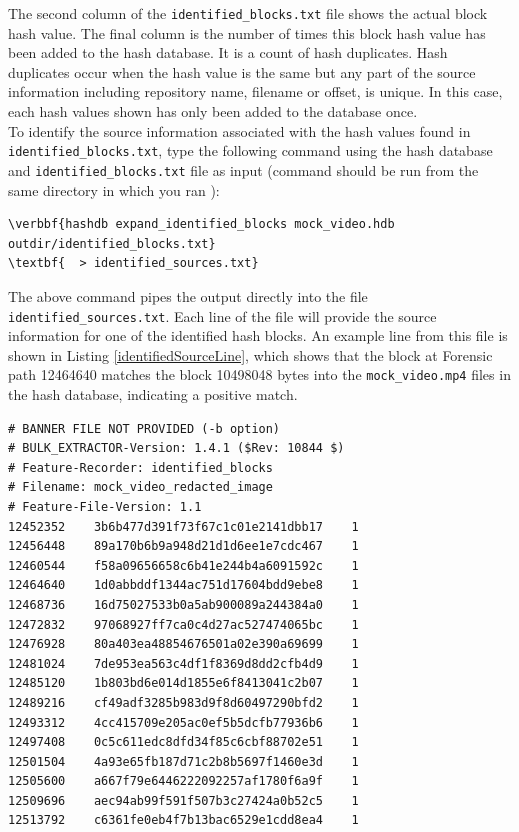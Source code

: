 \documentclass[11pt,fleqn]{article} %
\begin{document}
The second column of the \texttt{identified\_blocks.txt} file shows the actual block hash value. The final column is the number of times this block hash value has been added to the hash database. It is a count of hash duplicates. Hash duplicates occur when the hash value is the same but any part of the source information including repository name, filename or offset, is unique. In this case, each hash values shown has only been added to the database once.\\

To identify the source information associated with the hash values found in \texttt{identified\_blocks.txt}, type the following command using the hash database and \texttt{identified\_blocks.txt} file as input (command should be run from the same directory in which you ran \bulk):
\begin{Verbatim}[commandchars=\\\{\}]
\verbbf{hashdb expand_identified_blocks mock_video.hdb outdir/identified_blocks.txt} 
\textbf{  > identified_sources.txt}
\end{Verbatim}
The above command pipes the output directly into the file \texttt{identified\_sources.txt}. Each line of the file will provide the source information for one of the identified hash blocks. An example line from this file is shown in Listing \ref{identifiedSourceLine},
which shows that the block at Forensic path 12464640 matches the block 10498048 bytes into the \texttt{mock\_video.mp4} files in the hash database, indicating a positive match.\\

\lstset{style=customfile}
\begin{lstlisting}[float, caption={The \texttt{identified\_blocks.txt} file produced by \bulk's \textit{hashdb} scanner. First column is the forensic path, second is the hash value, and third is the number of times the hash value occurs in the database}, label=identifiedBlocks]
# BANNER FILE NOT PROVIDED (-b option)
# BULK_EXTRACTOR-Version: 1.4.1 ($Rev: 10844 $)
# Feature-Recorder: identified_blocks
# Filename: mock_video_redacted_image
# Feature-File-Version: 1.1
12452352	3b6b477d391f73f67c1c01e2141dbb17	1
12456448	89a170b6b9a948d21d1d6ee1e7cdc467	1
12460544	f58a09656658c6b41e244b4a6091592c	1
12464640	1d0abbddf1344ac751d17604bdd9ebe8	1
12468736	16d75027533b0a5ab900089a244384a0	1
12472832	97068927ff7ca0c4d27ac527474065bc	1
12476928	80a403ea48854676501a02e390a69699	1
12481024	7de953ea563c4df1f8369d8dd2cfb4d9	1
12485120	1b803bd6e014d1855e6f8413041c2b07	1
12489216	cf49adf3285b983d9f8d60497290bfd2	1
12493312	4cc415709e205ac0ef5b5dcfb77936b6	1
12497408	0c5c611edc8dfd34f85c6cbf88702e51	1
12501504	4a93e65fb187d71c2b8b5697f1460e3d	1
12505600	a667f79e6446222092257af1780f6a9f	1
12509696	aec94ab99f591f507b3c27424a0b52c5	1
12513792	c6361fe0eb4f7b13bac6529e1cdd8ea4	1
\end{lstlisting}
\end{document}
